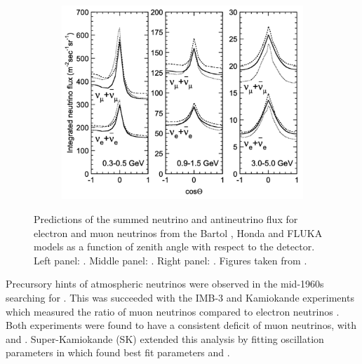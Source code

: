 \begin{figure}[h]
  \begin{subfigure}[t]{0.90\textwidth}
    \includegraphics[width=\textwidth, trim={0mm 0mm 0mm 0mm}, clip,page=1]{Figures/Theory/NuFluxZenithAngleDep.pdf}
  \end{subfigure}
  \caption{Predictions of the summed neutrino and antineutrino flux for electron and muon neutrinos from the Bartol \cite{Barr_2004}, Honda \cite{Honda_2007} and FLUKA \cite{etde_20239111} models as a function of zenith angle with respect to the detector. Left panel: . Middle panel: . Right panel: . Figures taken from \cite{Ashie_2005}.}
  \label{fig:NeutrinoOscillationPhysics_NuFluxZenithAngleDep}
\end{figure}

Precursory hints of atmospheric neutrinos were observed in the mid-1960s searching for  \cite{Reines1965-cf}. This was succeeded with the IMB-3 \cite{PhysRevLett.66.2561} and Kamiokande \cite{Hirata1992-qz} experiments which measured the ratio of muon neutrinos compared to electron neutrinos . Both experiments were found to have a consistent deficit of muon neutrinos, with  and . %
Super-Kamiokande (SK) \cite{Ashie_2005} extended this analysis by fitting oscillation parameters in  which found best fit parameters  and .

